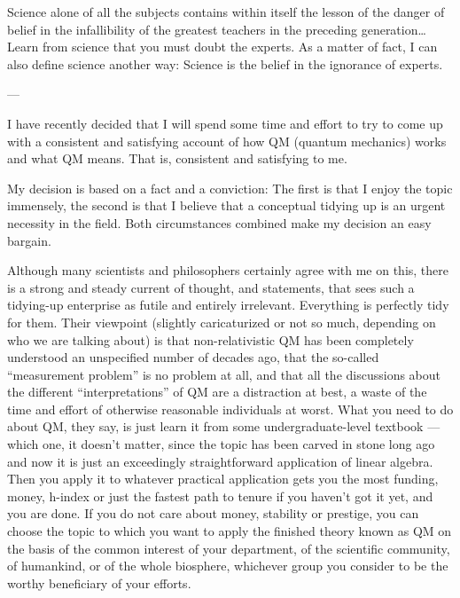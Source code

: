 \documentclass[a4paper,12pt]{article}
\begin{document}
\begin{flushright}
\parbox[h]{5in}{{\small
Science alone of all the subjects contains within itself the lesson of 
the danger of belief in the infallibility of the greatest teachers in the 
preceding generation\ldots Learn from science that you must doubt the experts. 
As a matter of fact, I can also define science another way: Science is the 
belief in the ignorance of experts.
\begin{flushright}
\vspace{-23.5pt}
--- \cite{Feynman1968}
\end{flushright}
}}
\end{flushright}

I have recently decided that I will spend some time and effort to try to come
up with a consistent and satisfying account of how QM (quantum mechanics)
works and what QM means. That is, consistent and satisfying to me.

My decision is based on a fact and a conviction: The first is that I enjoy the
topic immensely, the second is that I believe that a conceptual tidying up is
an urgent necessity in the field. Both circumstances combined make my decision
an easy bargain.

Although many scientists and philosophers certainly agree with me on this,
there is a strong and steady current of thought, and statements, that sees
such a tidying-up enterprise as futile and entirely irrelevant. Everything is
perfectly tidy for them. Their viewpoint (slightly caricaturized or not so
much, depending on who we are talking about) is that non-relativistic QM has
been completely understood an unspecified number of decades ago, that the
so-called ``measurement problem'' is no problem at all, and that all the
discussions about the different ``interpretations'' of QM are a distraction at
best, a waste of the time and effort of otherwise reasonable individuals at
worst. What you need to do about QM, they say, is just learn it from some
undergraduate-level textbook ---which one, it doesn't matter, since the topic
has been carved in stone long ago and now it is just an exceedingly
straightforward application of linear algebra. Then you apply it to whatever
practical application gets you the most funding, money, h-index or just the
fastest path to tenure if you haven't got it yet, and you are done. If you do
not care about money, stability or prestige, you can choose the topic to which
you want to apply the finished theory known as QM on the basis of the common
interest of your department, of the scientific community, of humankind, or of
the whole biosphere, whichever group you consider to be the worthy beneficiary
of your efforts.
\end{document}
